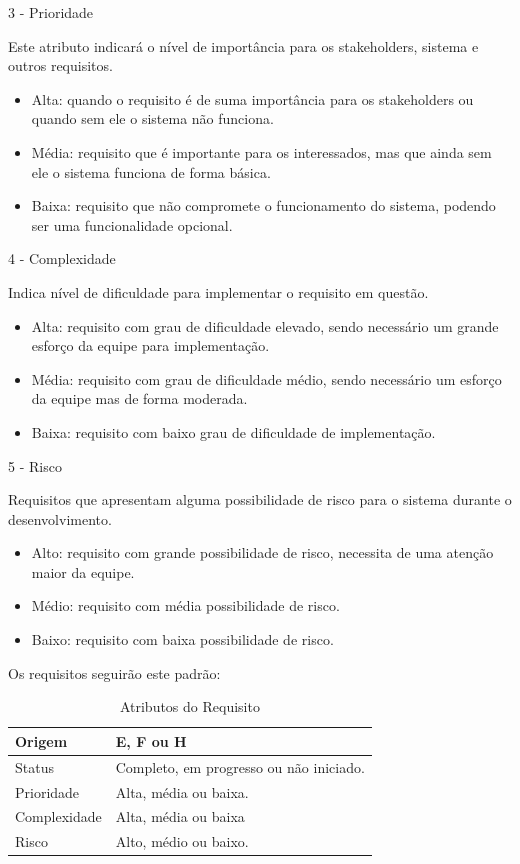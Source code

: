 3 - Prioridade

Este atributo indicará o nível de importância para os stakeholders, sistema e outros requisitos.

\begin{itemize}
\item Alta: quando o requisito é de suma importância para os stakeholders ou quando sem ele o sistema não funciona.
\item Média: requisito que é importante para os interessados, mas que ainda sem ele o sistema funciona de forma básica.
\item Baixa: requisito que não compromete o funcionamento do sistema, podendo ser uma funcionalidade opcional.
\end{itemize}

4 - Complexidade

Indica nível de dificuldade para implementar o requisito em questão.

\begin{itemize}
\item Alta: requisito com grau de dificuldade elevado, sendo necessário um grande esforço da equipe para implementação.
\item Média: requisito com grau de dificuldade médio, sendo necessário um esforço da equipe mas de forma moderada.
\item Baixa: requisito com baixo grau de dificuldade de  implementação.
\end{itemize}

5 - Risco

Requisitos que apresentam alguma possibilidade de risco para o sistema durante o desenvolvimento.

\begin{itemize}
\item Alto: requisito com grande possibilidade de risco, necessita de uma atenção maior da equipe.
\item Médio: requisito com média possibilidade de risco.
\item Baixo: requisito com baixa possibilidade de risco.
\end{itemize}

Os requisitos seguirão este padrão:

\begin{table}[\htp]
\centering
\caption{Atributos do Requisito}
\label{my-label}
\begin{tabular}{|l|l|}
\hline
Origem      & E, F ou H                                         \\ \hline
Status    & Completo, em progresso ou não iniciado. \\ \hline
Prioridade & Alta, média ou baixa.\\ \hline
Complexidade & Alta, média ou baixa\\ \hline
Risco  & Alto, médio ou baixo.\\ \hline
\end{tabular}
\end{table}

